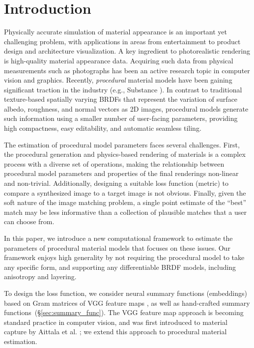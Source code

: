 \section{Introduction}
\label{sec:bayesian:intro}

Physically accurate simulation of material appearance is an important yet challenging problem, with applications in areas from entertainment to product design and architecture visualization.
A key ingredient to photorealistic rendering is high-quality material appearance data.
Acquiring such data from physical measurements such as photographs has been an active research topic in computer vision and graphics. Recently, \emph{procedural} material models have been gaining significant traction in the industry (e.g., Substance \cite{Substance}).
In contrast to traditional texture-based spatially varying BRDFs that represent the variation of surface albedo, roughness, and normal vectors as 2D images, procedural models generate such information using a smaller number of user-facing parameters, providing high compactness, easy editability, and automatic seamless tiling.

The estimation of procedural model parameters faces several challenges. First, the procedural generation and physics-based rendering of materials is a complex process with a diverse set of operations, making the relationship between procedural model parameters and properties of the final renderings non-linear and non-trivial.
Additionally, designing a suitable loss function (metric) to compare a synthesized image to a target image is not obvious. Finally, given the soft nature of the image matching problem, a single point estimate of the ``best'' match may be less informative than a collection of plausible matches that a user can choose from.

In this paper, we introduce a new computational framework to estimate the parameters of procedural material models that focuses on these issues.
Our framework enjoys high generality by not requiring the procedural model to take any specific form, and supporting any differentiable BRDF models, including anisotropy and layering.

To design the loss function, we consider neural summary functions (embeddings) based on Gram matrices of VGG feature maps \cite{Gatys2015,Gatys2016}, as well as hand-crafted summary functions~(\S\ref{sec:summary_func}). The VGG feature map approach is becoming standard practice in computer vision, and was first introduced to material capture by Aittala et al. \cite{Aittala2016}; we extend this approach to procedural material estimation.


